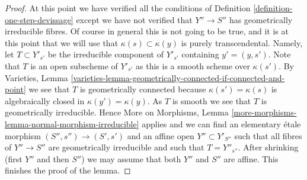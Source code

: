 \documentclass[10pt,a4paper]{amsart}
\theoremstyle{plain}
\theoremstyle{definition}
\theoremstyle{remark}
\numberwithin{equation}{subsection}
\begin{document}
\begin{proof}
\medskip\noindent
At this point we have verified all the conditions of
Definition \ref{definition-one-step-devissage}
except we have not verified that $Y'' \to S''$ has geometrically
irreducible fibres. Of course in general this is not going to be
true, and it is at this point that we will use that
$\kappa(s) \subset \kappa(y)$ is purely transcendental. Namely,
let $T \subset Y'_{s'}$ be the irreducible component of
$Y'_{s'}$ containing $y' = (y, s')$. Note that $T$ is an open subscheme
of $Y'_{s'}$ as this is a smooth scheme over $\kappa(s')$. By
Varieties,
Lemma \ref{varieties-lemma-geometrically-connected-if-connected-and-point}
we see that $T$ is geometrically connected because $\kappa(s') = \kappa(s)$
is algebraically closed in $\kappa(y') = \kappa(y)$.
As $T$ is smooth we see that $T$ is geometrically irreducible. Hence
More on Morphisms,
Lemma \ref{more-morphisms-lemma-normal-morphism-irreducible}
applies and we can find an elementary \'etale morphism
$(S'', s'') \to (S', s')$ and an affine open $Y'' \subset Y'_{S''}$
such that all fibres of $Y'' \to S''$ are geometrically irreducible
and such that $T = Y''_{s''}$. After shrinking (first $Y''$ and then $S''$)
we may assume that both $Y''$ and $S''$ are affine.
This finishes the proof of the lemma.
\end{proof}
\end{document}
